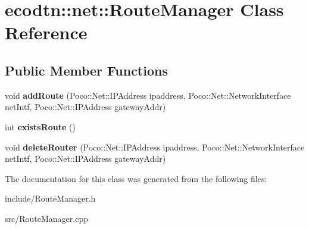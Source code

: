 \hypertarget{classecodtn_1_1net_1_1RouteManager}{}\section{ecodtn\+:\+:net\+:\+:Route\+Manager Class Reference}
\label{classecodtn_1_1net_1_1RouteManager}
\subsection*{Public Member Functions}
\begin{DoxyCompactItemize}
\item 
\mbox{\label{classecodtn_1_1net_1_1RouteManager_a76afae482c972894af687240fbd2a122}} 
void {\bfseries add\+Route} (Poco\+::\+Net\+::\+I\+P\+Address ipaddress, Poco\+::\+Net\+::\+Network\+Interface net\+Intf, Poco\+::\+Net\+::\+I\+P\+Address gateway\+Addr)
\item 
\mbox{\label{classecodtn_1_1net_1_1RouteManager_a95c0b799743b9ade06687c25b528b8b4}} 
int {\bfseries exists\+Route} ()
\item 
\mbox{\label{classecodtn_1_1net_1_1RouteManager_a208d15583704128a3031ea8b5b47a508}} 
void {\bfseries delete\+Router} (Poco\+::\+Net\+::\+I\+P\+Address ipaddress, Poco\+::\+Net\+::\+Network\+Interface net\+Intf, Poco\+::\+Net\+::\+I\+P\+Address gateway\+Addr)
\end{DoxyCompactItemize}


The documentation for this class was generated from the following files\+:\begin{DoxyCompactItemize}
\item 
include/Route\+Manager.\+h\item 
src/Route\+Manager.\+cpp\end{DoxyCompactItemize}
